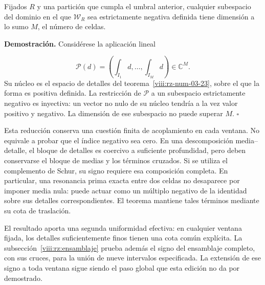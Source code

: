 Fijados \(R\) y una partición que cumpla el umbral anterior, cualquier subespacio del dominio en el que \(\mathscr W_R\) sea estrictamente negativa definida tiene dimensión a lo sumo \(M\), el número de celdas.

\textbf{Demostración.} Considérese la aplicación lineal

\[
\mathcal P(d)=\left(\int_{I_1}d,\ldots,
\int_{I_M}d\right)\in\mathbb C^M.
\]
Su núcleo es el espacio de detalles del teorema~\ref{viii:rz-num-03-23}, sobre el que la forma es positiva definida. La restricción de \(\mathcal P\) a un subespacio estrictamente negativo es inyectiva: un vector no nulo de su núcleo tendría a la vez valor positivo y negativo. La dimensión de ese subespacio no puede superar \(M\). \hfill\(\square\)

Esta reducción conserva una cuestión finita de acoplamiento en cada ventana. No equivale a probar que el índice negativo sea cero. En una descomposición media–detalle, el bloque de detalles es coercivo a suficiente profundidad, pero deben conservarse el bloque de medias y los términos cruzados. Si se utiliza el complemento de Schur, su signo requiere esa composición completa. En particular, una resonancia prima exacta entre dos celdas no desaparece por imponer media nula: puede actuar como un múltiplo negativo de la identidad sobre sus detalles correspondientes. El teorema mantiene tales términos mediante su cota de traslación.

El resultado aporta una segunda uniformidad efectiva: en cualquier ventana fijada, los detalles suficientemente finos tienen una cota común explícita. La subsección~\ref{viii:rz:ensamblaje} prueba además el signo del ensamblaje completo, con sus cruces, para la unión de nueve intervalos especificada. La extensión de ese signo a toda ventana sigue siendo el paso global que esta edición no da por demostrado.
